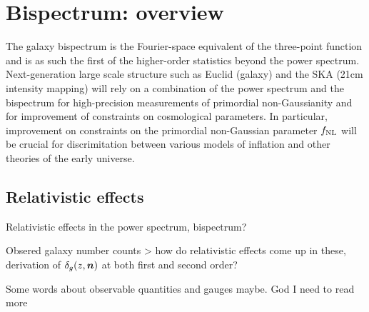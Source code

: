 \chapter{Bispectrum: overview}
\label{chapter:introbisp}


The galaxy bispectrum is the Fourier-space equivalent of the three-point function and is as such the first of the higher-order statistics beyond the power spectrum. Next-generation large scale structure such as Euclid (galaxy) and the SKA (21cm intensity mapping) will rely on a combination of the power spectrum and the bispectrum for high-precision measurements of primordial non-Gaussianity and for improvement of constraints on cosmological parameters. In particular, improvement on constraints on the primordial non-Gaussian parameter $f_\text{NL}$ will be crucial for discrimitation between various models of inflation and other theories of the early universe. 

\section{Relativistic effects}

Relativistic effects in the power spectrum, bispectrum?

Obsered galaxy number counts > how do relativistic effects come up in these, derivation of $\delta_g(z,\bm {n})$ at both first and second order?

Some words about observable quantities and gauges maybe. God I need to read more 

